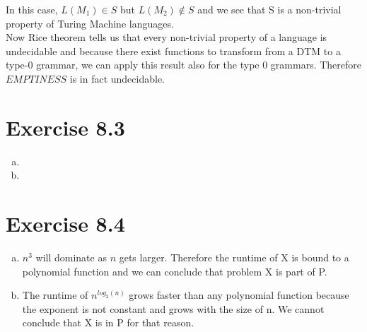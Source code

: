 \documentclass{article} %
\newcommand{\homeworkNumber}{8}
\begin{document}
In this case, $L(M_1) \in S$ but $L(M_2) \notin S$ and we see that S is a non-trivial property of Turing Machine languages.\\

Now Rice theorem tells us that every non-trivial property of a language is undecidable and because there exist functions to transform from a DTM to a type-0 grammar, we can apply this result also for the type 0 grammars. Therefore $EMPTINESS$ is in fact undecidable.

\section*{Exercise \homeworkNumber.3}
\begin{enumerate}[(a)]
\item 


\item
\end{enumerate}

\section*{Exercise \homeworkNumber.4}
\begin{enumerate}[(a)]
\item $n^3$ will dominate as $n$ gets larger. Therefore the runtime of X is bound to a polynomial function and we can conclude that problem X is part of P.
\item The runtime of $n^{log_2(n)}$ grows faster than any polynomial function because the exponent is not constant and grows with the size of n. We cannot conclude that X is in P for that reason.
\end{enumerate}
\end{document}
